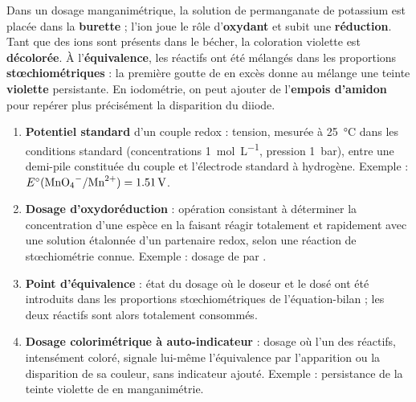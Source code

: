 \documentclass[11pt]{article}
\begin{document}
\begin{corrige}
Dans un dosage manganimétrique, la solution de permanganate de potassium est placée dans la \textbf{burette} ; l'ion  joue le rôle d'\textbf{oxydant} et subit une \textbf{réduction}. Tant que des ions  sont présents dans le bécher, la coloration violette est \textbf{décolorée}. À l'\textbf{équivalence}, les réactifs ont été mélangés dans les proportions \textbf{stœchiométriques} : la première goutte de  en excès donne au mélange une teinte \textbf{violette} persistante. En iodométrie, on peut ajouter de l'\textbf{empois d'amidon} pour repérer plus précisément la disparition du diiode.
\end{corrige}

\begin{corrige}
\begin{enumerate}
\item \textbf{Potentiel standard} d'un couple redox : tension, mesurée à \SI{25}{\celsius} dans les conditions standard (concentrations \SI{1}{mol.L^{-1}}, pression \SI{1}{bar}), entre une demi-pile constituée du couple et l'électrode standard à hydrogène. Exemple : $E^\circ(\ce{MnO4-}/\ce{Mn^2+}) = \SI{1,51}{V}$.
\item \textbf{Dosage d'oxydoréduction} : opération consistant à déterminer la concentration d'une espèce en la faisant réagir totalement et rapidement avec une solution étalonnée d'un partenaire redox, selon une réaction de stœchiométrie connue. Exemple : dosage de  par .
\item \textbf{Point d'équivalence} : état du dosage où le doseur et le dosé ont été introduits dans les proportions stœchiométriques de l'équation-bilan ; les deux réactifs sont alors totalement consommés.
\item \textbf{Dosage colorimétrique à auto-indicateur} : dosage où l'un des réactifs, intensément coloré, signale lui-même l'équivalence par l'apparition ou la disparition de sa couleur, sans indicateur ajouté. Exemple : persistance de la teinte violette de  en manganimétrie.
\end{enumerate}
\end{corrige}
\end{document}
